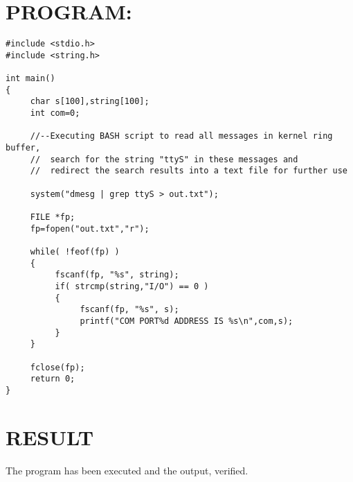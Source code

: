 \section*{PROGRAM:}
\begin{lstlisting}
#include <stdio.h>
#include <string.h>

int main()
{
     char s[100],string[100];
     int com=0;
     
     //--Executing BASH script to read all messages in kernel ring buffer,
     //  search for the string "ttyS" in these messages and
     //  redirect the search results into a text file for further use
     
     system("dmesg | grep ttyS > out.txt");
     
     FILE *fp;
     fp=fopen("out.txt","r");
     
     while( !feof(fp) )
     {
          fscanf(fp, "%s", string);
          if( strcmp(string,"I/O") == 0 )
          {
               fscanf(fp, "%s", s);
               printf("COM PORT%d ADDRESS IS %s\n",com,s);
          }
     }
     
     fclose(fp);
     return 0;
}
\end{lstlisting}

\section*{RESULT}
The program has been executed and the output, verified.
%
%
